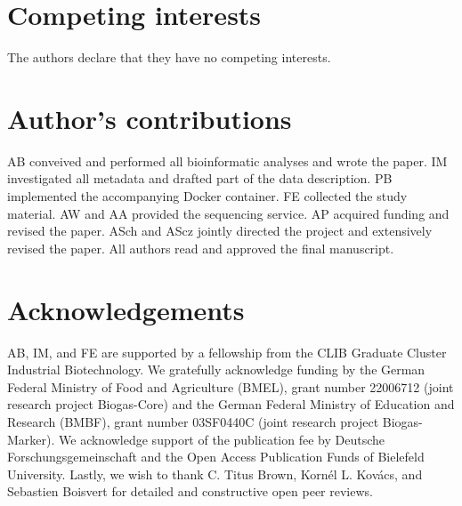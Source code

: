 \documentclass{bmcart}
\begin{document}
\begin{backmatter}

\section*{Competing interests}
The authors declare that they have no competing interests.

\section*{Author's contributions}
AB conveived and performed all bioinformatic analyses and wrote the paper.
IM investigated all metadata and drafted part of the data description.
PB implemented the accompanying Docker container.
FE collected the study material.
AW and AA provided the sequencing service.
AP acquired funding and revised the paper.
ASch and AScz jointly directed the project and extensively revised the paper.
All authors read and approved the final manuscript.

\section*{Acknowledgements}
AB, IM, and FE are supported by a fellowship from the CLIB Graduate Cluster Industrial Biotechnology.
We gratefully acknowledge funding by the German Federal Ministry of Food and Agriculture (BMEL), grant number 22006712 (joint research project Biogas-Core) and the German Federal Ministry of Education and Research (BMBF), grant number 03SF0440C (joint research project Biogas-Marker).
We acknowledge support of the publication fee by Deutsche Forschungsgemeinschaft and the Open Access Publication Funds of Bielefeld University.
Lastly, we wish to thank C. Titus Brown, Kornél L. Kovács, and Sebastien Boisvert for detailed and constructive open peer reviews.



\end{backmatter}
\end{document}
